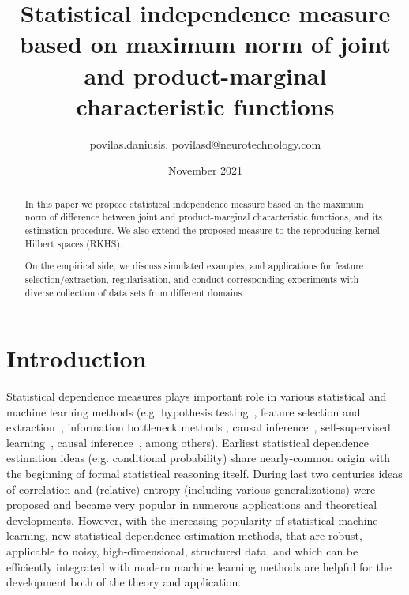 \documentclass{article}
\title{Statistical independence measure based on maximum norm of joint and product-marginal characteristic functions}
\author{povilas.daniusis, povilasd@neurotechnology.com}
\date{November 2021}
\begin{document}
\maketitle

%

\begin{abstract}
    In this paper we propose statistical independence measure based on the maximum norm of difference between joint and product-marginal characteristic functions, and its estimation procedure. We also extend the proposed measure to the reproducing kernel Hilbert spaces (RKHS).
    
    On the empirical side, we discuss simulated examples, and applications for feature selection/extraction, regularisation, and conduct corresponding experiments with diverse collection of data sets from different domains.
\end{abstract}

\section{Introduction}
Statistical dependence measures plays important role in various statistical and machine learning methods (e.g. hypothesis testing~\cite{Gretton2005MeasuringSD}, feature selection and extraction~\cite{EigenHSIC}, information bottleneck methods \cite{Ma2020TheHB}, causal inference~\cite{NIPS2008_f7664060}, self-supervised learning~\cite{li2021selfsupervised}, causal inference~\cite{NIPS2008_f7664060}, among others).  Earliest statistical dependence estimation ideas (e.g. conditional probability) share nearly-common origin with the beginning of formal statistical reasoning itself. During last two centuries ideas of correlation and (relative) entropy (including various generalizations) were proposed and became very popular in numerous applications and theoretical developments. However, with the increasing popularity of statistical machine learning, new statistical dependence estimation methods, that are robust, applicable to noisy, high-dimensional, structured data, and which can be efficiently integrated with modern machine learning methods are helpful for the development both of the theory and application.
\end{document}

